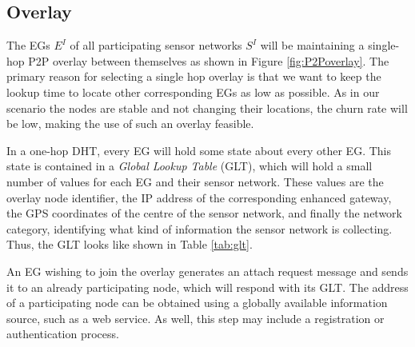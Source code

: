 \documentclass[onecolumn]{jaise2e}
\begin{document}
\subsection{Overlay}\label{subsec:overlay}

The EGs $E^I$ of all participating sensor networks $S^I$ will be maintaining a single-hop P2P overlay between themselves as shown in Figure \ref{fig:P2Poverlay}. The primary reason for selecting a single hop overlay is that we want to keep the lookup time to locate other corresponding EGs as low as possible. As in our scenario the nodes are stable and not changing their locations, the churn rate will be low, making the use of such an overlay feasible.



In a one-hop DHT, every EG will hold some state about every other EG. This state is contained in a \textit{Global Lookup Table} (GLT), which will hold a small number of values for each EG and their sensor network. These values are the overlay node identifier, the IP address of the corresponding enhanced gateway, the GPS coordinates of the centre of the sensor network, and finally the network category, identifying what kind of information the sensor network is collecting. Thus, the GLT looks like shown in Table \ref{tab:glt}. 

An EG wishing to join the overlay generates an attach request message and sends it to an already participating node, which will respond with its GLT. The address of a participating node can be obtained using a globally available information source, such as a web service. As well, this step may include a registration or authentication process.
\end{document}
